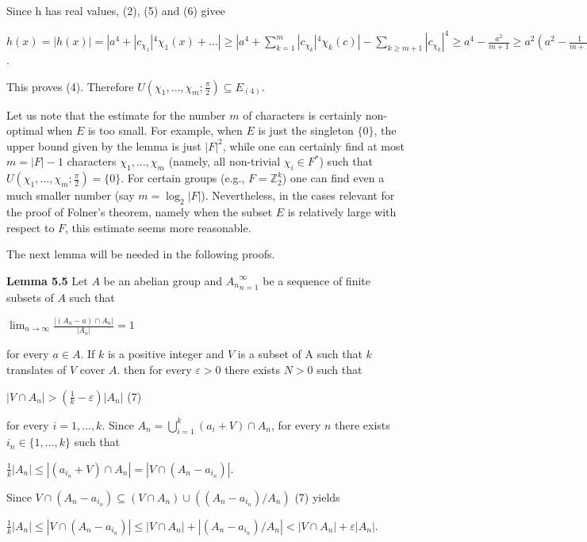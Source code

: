 \documentclass[12pt]{article}
\begin{document}
Since h has real values, (2), (5) and (6) givee


$h(x) = |h(x)| = |a^4 + |c_{\chi_1}|^4 \chi_1 (x) + \dots | \geq |a^4 + \sum^m_{k=1} |c_{\chi_k}|^4 \chi_k (c)| - \sum_{k \geq m + 1} |c_{\chi_k}|^4 \geq a^4 - \frac{a^2}{m+1} \geq a^2(a^2 - \frac{1}{m+1}) > 0$.


This proves (4). Therefore $U(\chi_1, \dots, \chi_m; \frac{\pi}{2}) \subseteq E_{(4)}$.



Let us note that the estimate for the number $m$ of characters is certainly non-optimal when $E$ is too small.
For example, when $E$ is just the singleton $\{0\}$, the upper bound given by the lemma is just $|F|^2$, while one
can certainly find at most $m = |F| - 1$ characters $\chi_1, . . . , \chi_m$ (namely, all non-trivial $\chi_i \in F^*$) such that
$U(\chi_1, . . . , \chi_m; \frac{\pi}{2}) = \{0\}$. For certain groups (e.g., $F = \mathbb{Z}^k_2$) one can find even a much smaller number (say
$m = \log_2|F|$). Nevertheless, in the cases relevant for the proof of Folner's theorem, namely when the subset $E$
is relatively large with respect to $F$, this estimate seems more reasonable.


    The next lemma will be needed in the following proofs.


\textbf{Lemma 5.5} Let $A$ be an abelian group and ${A_n}^{\infty}_{n=1}$ be a sequence of finite subsets of $A$ such that


    $\lim_{n \to \infty} \frac{|(A_n - a) \cap A_n|}{|A_n|} = 1$


for every $a \in A$. If $k$ is a positive integer and $V$ is a subset of A such that $k$ translates of $V$ cover $A$. then for
every $\varepsilon > 0$ there exists $N > 0$ such that


    $|V \cap A_n| > (\frac{1}{k} - \varepsilon) |A_n|$ (7)


for every $i = 1, \dots, k$. Since $A_n = \bigcup^k_{i=1} (a_i + V) \cap A_n$, for every $n$ there exists $i_n \in \{1, \dots, k\}$ such that


    $\frac{1}{k} |A_n| \leq |(a_{i_n} + V) \cap A_n| = |V \cap (A_n - a_{i_n})|$.


Since $V \cap (A_n - a_{i_n}) \subseteq (V \cap A_n) \cup ((A_n - a_{i_n}) / A_n)$  (7) yields


    $\frac{1}{k}|A_n| \leq |V \cap (A_n - a_{i_n})| \leq |V \cap A_n| + |(A_n - a_{i_n}) / A_n| < |V \cap A_n| + \varepsilon |A_n|$.
\end{document}
